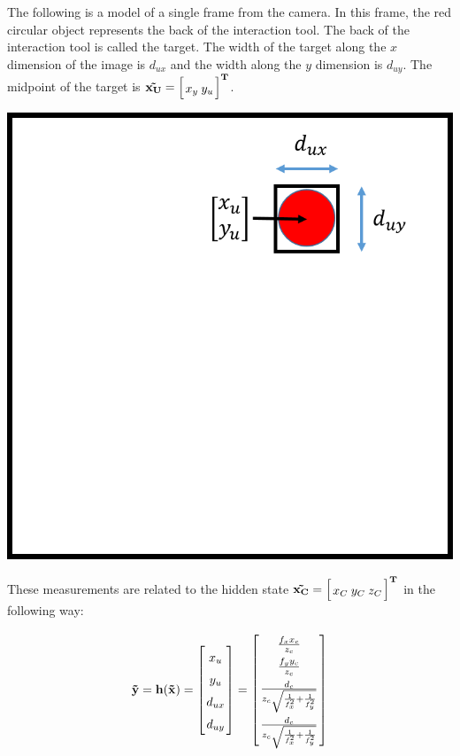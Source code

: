 \documentclass{article}
\newcommand{\mat}[2][ccccccccccccccccccccccccccccccccccccccccccccc]{\left[
        \arraycolsep=1.2pt\def\arraystretch{1.5}
        \begin{array}{#1} #2 \\ 
        \end{array} 
        \right]}
\begin{document}
\begin{flushleft}
\medskip
\medskip
The following is a model of a single frame from the camera. In this frame,
the red circular object represents the back of the interaction tool. The back
of the interaction tool is called the target. The width of the target along
the $x$ dimension of the image is $d_{ux}$ and the width along the $y$ 
dimension is $d_{uy}$. The midpoint of the target is 
$\bf{\vec{x_U}} = \mat{ x_y & y_u }^{T}$.

\medskip

\begin{center}
    \includegraphics[scale=0.4]{cameraMeasurement}
\end{center}

\medskip

These measurements are related to the hidden state $\bf{\vec{x_C}} = 
\mat{ x_C & y_C & z_C }^{T}$ in the following way: 

\[
    \bf{\vec{y}} = h(\bf{\vec{x}})
         = \mat{x_u \\ y_u \\ d_{ux} \\ d_{uy}} 
     = \mat{ \frac{f_x x_c}{z_c} \\ 
             \frac{f_y y_c}{z_c} \\ 
             \frac{d_c}{z_c \sqrt{\frac{1}{f_x^{2}} + \frac{1}{f_y^{2}}}} \\
             \frac{d_c}{z_c \sqrt{\frac{1}{f_x^{2}} + \frac{1}{f_y^{2}}}}
           }
\]

\end{flushleft}
\end{document}
